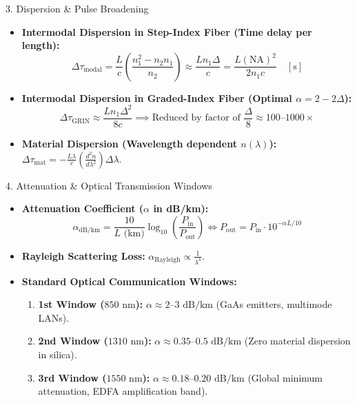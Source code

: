\begin{formulabox}{3. Dispersion \& Pulse Broadening}
\begin{itemize}[leftmargin=*,itemsep=2pt]
    \item \textbf{Intermodal Dispersion in Step-Index Fiber (Time delay per length):}
    \[
    \Delta \tau_{\text{modal}} = \frac{L}{c}\left(\frac{n_1^2 - n_2 n_1}{n_2}\right) \approx \frac{L n_1 \Delta}{c} = \frac{L (\text{NA})^2}{2 n_1 c} \quad [\text{s}]
    \]
    \item \textbf{Intermodal Dispersion in Graded-Index Fiber (Optimal $\alpha = 2 - 2\Delta$):}
    \[
    \Delta \tau_{\text{GRIN}} \approx \frac{L n_1 \Delta^2}{8 c} \implies \text{Reduced by factor of } \frac{\Delta}{8} \approx 100\text{--}1000\times
    \]
    \item \textbf{Material Dispersion (Wavelength dependent $n(\lambda)$):} $\Delta \tau_{\text{mat}} = -\frac{L \lambda}{c}\left(\frac{d^2 n}{d\lambda^2}\right) \Delta\lambda$.
\end{itemize}
\end{formulabox}

\begin{formulabox}{4. Attenuation \& Optical Transmission Windows}
\begin{itemize}[leftmargin=*,itemsep=2pt]
    \item \textbf{Attenuation Coefficient ($\alpha$ in dB/km):}
    \[
    \alpha_{\text{dB/km}} = \frac{10}{L\text{ (km)}} \log_{10}\left(\frac{P_{\text{in}}}{P_{\text{out}}}\right) \iff P_{\text{out}} = P_{\text{in}} \cdot 10^{-\alpha L / 10}
    \]
    \item \textbf{Rayleigh Scattering Loss:} $\alpha_{\text{Rayleigh}} \propto \frac{1}{\lambda^4}$.
    \item \textbf{Standard Optical Communication Windows:}
    \begin{enumerate}[itemsep=1pt]
        \item \textbf{1st Window ($850\text{ nm}$):} $\alpha \approx 2\text{--}3\text{ dB/km}$ (GaAs emitters, multimode LANs).
        \item \textbf{2nd Window ($1310\text{ nm}$):} $\alpha \approx 0.35\text{--}0.5\text{ dB/km}$ (Zero material dispersion in silica).
        \item \textbf{3rd Window ($1550\text{ nm}$):} $\alpha \approx 0.18\text{--}0.20\text{ dB/km}$ (Global minimum attenuation, EDFA amplification band).
    \end{enumerate}
\end{itemize}
\end{formulabox}
